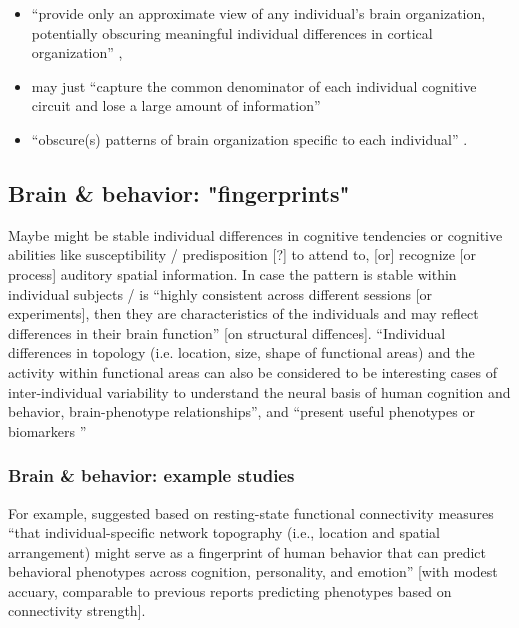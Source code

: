 \begin{itemize}

\item ``provide only an approximate view of any individual's brain organization,
    potentially obscuring meaningful individual differences in cortical
        organization'' \citep{laumann2015functional},

\item may just ``capture the common denominator of each individual cognitive
    circuit and lose a large amount of information''

\item ``obscure(s) patterns of brain organization specific to each individual''
    \citep{laumann2015functional}.

\end{itemize}


\subsection{Brain \& behavior: "fingerprints"}

%
Maybe might be stable individual differences in cognitive tendencies or
cognitive abilities like susceptibility / predisposition [?] to attend to, [or]
recognize [or process] auditory spatial information.
In case the pattern is stable within individual subjects / is ``highly
consistent across different sessions [or experiments], then they are
characteristics of the individuals and may reflect differences in their brain
function'' \citep{kanai2011structural} [on structural diffences].
%
``Individual differences in topology (i.e. location, size, shape of functional
areas) and the activity within functional areas can also be considered to be
interesting cases of inter-individual variability to understand the neural basis
of human cognition and behavior, brain-phenotype relationships'', and ``present
useful phenotypes or biomarkers \citep{glasser2016multi,
vanhorn2008individual}''


\subsubsection{Brain \& behavior: example studies}


%
For example, \citet{kong2019spatial} suggested based on resting-state functional
connectivity measures ``that individual-specific network topography (i.e.,
location and spatial arrangement) might serve as a fingerprint of human behavior
that can predict behavioral phenotypes across cognition, personality, and
emotion'' \citep{kong2019spatial} [with modest accuary, comparable to previous
reports predicting phenotypes based on connectivity strength].

